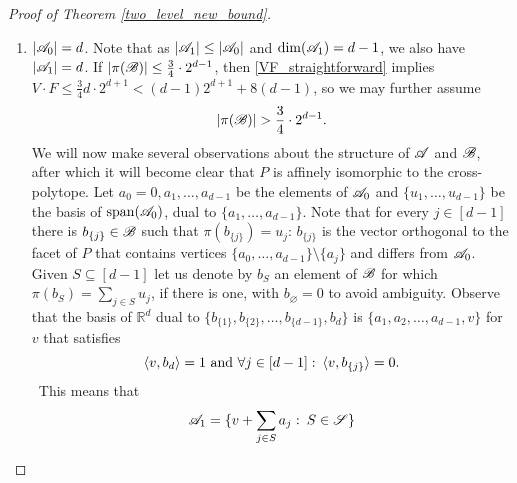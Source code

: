\begin{proof}[Proof of Theorem \ref{two_level_new_bound}]
\begin{enumerate}
        \item $\left|{\mathscr{A}}_0\right| = d$. Note that as $|{\mathscr{A}}_1| \leq |{\mathscr{A}}_0|$ and $\operatorname{dim}({\mathscr{A}}_1)=d-1$, we also have $\left|{\mathscr{A}}_1\right|=d$. If $|\pi({\mathscr{B}})|\leq \frac{3}{4} \cdot 2^{d-1}$, then \eqref{VF_straightforward} implies $V \cdot F \leq \frac{3}{4} d \cdot 2^{d+1} < (d-1)2^{d+1} + 8(d-1)$, so we may further assume
        \begin{equation}\label{piBisLarge}
            |\pi({\mathscr{B}})| > \frac{3}{4} \cdot 2^{d-1}.
        \end{equation}
        We will now make several observations about the structure of ${\mathscr{A}}$ and ${\mathscr{B}}$, after which it will become clear that $P$ is affinely isomorphic to the cross-polytope. Let $a_0=0, a_1, \ldots, a_{d-1}$ be the elements of ${\mathscr{A}}_0$ and $\{u_{1}, \ldots, u_{d-1}\}$ be the basis of $\operatorname{span}({\mathscr{A}}_0)$, dual to $\{a_1, \ldots, a_{d-1}\}$. Note that for every $j\in [d-1]$ there is $b_{\{j\}}\in {\mathscr{B}}$ such that $\pi(b_{\{j\}})=u_j$: $b_{\{j\}}$ is the vector orthogonal to the facet of $P$ that contains vertices $\{a_0, \ldots, a_{d-1}\}\setminus \{a_j\}$ and differs from ${\mathscr{A}}_0$. Given $S\subseteq [d-1]$ let us denote by $b_{S}$ an element of ${\mathscr{B}}$ for which $\pi(b_S)=\sum_{j\in S}u_j$, if there is one, with $b_{\varnothing}=0$ to avoid ambiguity. Observe that the basis of $\mathbb{R}^d$ dual to $\{b_{\{1\}}, b_{\{2\}}, \ldots, b_{\{d-1\}}, b_d\}$ is $\{a_1, a_2, \ldots, a_{d-1}, v\}$ for $v$ that satisfies 
        \[
            \langle v, b_d\rangle = 1\text{ and }\forall j \in [d-1]:\:\langle v, b_{\{j\}}\rangle = 0.
        \]\
        This means that 
        \begin{equation}\label{A1-representation}
            {\mathscr{A}}_1 = \{v+\sum_{j \in S}a_j:\:S\in {\mathscr{S}}\}
        \end{equation}
    

\end{enumerate}
\end{proof}
